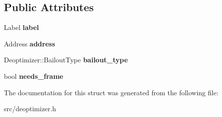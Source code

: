 \subsection*{Public Attributes}
\begin{DoxyCompactItemize}
\item 
\hypertarget{structv8_1_1internal_1_1_deoptimizer_1_1_jump_table_entry_a773518a70aa1fc7bb2522f4f32aa7061}{}Label {\bfseries label}\label{structv8_1_1internal_1_1_deoptimizer_1_1_jump_table_entry_a773518a70aa1fc7bb2522f4f32aa7061}

\item 
\hypertarget{structv8_1_1internal_1_1_deoptimizer_1_1_jump_table_entry_a05e545ad11c8aacddc3e2043f5436312}{}Address {\bfseries address}\label{structv8_1_1internal_1_1_deoptimizer_1_1_jump_table_entry_a05e545ad11c8aacddc3e2043f5436312}

\item 
\hypertarget{structv8_1_1internal_1_1_deoptimizer_1_1_jump_table_entry_ad60122e0236f06e3159fee027ed9da37}{}Deoptimizer\+::\+Bailout\+Type {\bfseries bailout\+\_\+type}\label{structv8_1_1internal_1_1_deoptimizer_1_1_jump_table_entry_ad60122e0236f06e3159fee027ed9da37}

\item 
\hypertarget{structv8_1_1internal_1_1_deoptimizer_1_1_jump_table_entry_a4861a397798dc81c0db98e2f621480bf}{}bool {\bfseries needs\+\_\+frame}\label{structv8_1_1internal_1_1_deoptimizer_1_1_jump_table_entry_a4861a397798dc81c0db98e2f621480bf}

\end{DoxyCompactItemize}


The documentation for this struct was generated from the following file\+:\begin{DoxyCompactItemize}
\item 
src/deoptimizer.\+h\end{DoxyCompactItemize}
